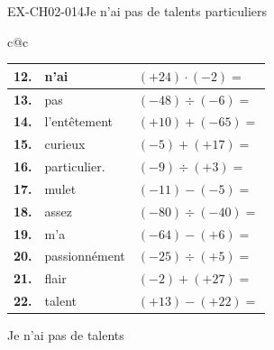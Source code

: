 \begin{exercice}{EX-CH02-014}{Je n'ai pas de talents particuliers}
\begin{center}
\begin{tabular}{c@{\hspace{8mm}}c}
  \begin{tabular}{|>{\centering\arraybackslash}p{6mm}|p{3.5cm}|p{3cm}|}
    \hline
    \cellcolor{gray!40}\textbf{12.} &n'ai& $(+24)\cdot(-2)=$             \\ \hline
    \cellcolor{gray!40}\textbf{13.} &pas& $(-48)\div(-6)=$               \\ \hline
    \cellcolor{gray!40}\textbf{14.} &l'entêtement& $(+10)+(-65)=$                \\ \hline
    \cellcolor{gray!40}\textbf{15.} &curieux& $(-5)+(+17)=$                 \\ \hline
    \cellcolor{gray!40}\textbf{16.} &particulier.& $(-9)\div(+3)=$                \\ \hline
    \cellcolor{gray!40}\textbf{17.} &mulet& $(-11)-(-5)=$       \\ \hline
    \cellcolor{gray!40}\textbf{18.} &assez& $(-80)\div(-40)=$              \\ \hline
    \cellcolor{gray!40}\textbf{19.} &m'a& $(-64)-(+6)=$      \\ \hline
    \cellcolor{gray!40}\textbf{20.} &passionnément& $(-25)\div(+5)=$               \\ \hline
    \cellcolor{gray!40}\textbf{21.} &flair& $(-2)+(+27)=$                 \\ \hline
    \cellcolor{gray!40}\textbf{22.} &talent& $(+13)-(+22)=$     \\ \hline
  \end{tabular}

\end{tabular}
\end{center}

\bigskip
\noindent Je n'ai pas de talents \dotfill \\
\vspace{1cm}
\noindent\dotfill\\[0.5cm]
\dotfill
{}

\end{exercice}


